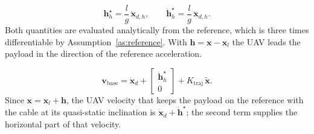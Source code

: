 
\begin{equation}\label{eq:href}
\mathbf{h}_h^\star = \frac{l}{g}\,\ddot{\mathbf{x}}_{d,h},\qquad
\dot{\mathbf{h}}_h^\star = \frac{l}{g}\,\dddot{\mathbf{x}}_{d,h}.
\end{equation}
Both quantities are evaluated analytically from the reference, which is three times
differentiable by Assumption~\ref{as:reference}. With $\mathbf{h}=\mathbf{x}-\mathbf{x}_l$ the
UAV leads the payload in the direction of the reference acceleration.

\begin{equation}\label{eq:base_reference}
\mathbf{v}_{\mathrm{base}} = \dot{\mathbf{x}}_d + \begin{bmatrix}\dot{\mathbf{h}}_h^\star\\ 0\end{bmatrix}
 + K_{\mathrm{traj}}\,\tilde{\mathbf{x}}.
\end{equation}
Since $\mathbf{x}=\mathbf{x}_l+\mathbf{h}$, the UAV velocity that keeps the payload on the reference
with the cable at its quasi-static inclination is $\dot{\mathbf{x}}_d+\dot{\mathbf{h}}^\star$; the
second term supplies the horizontal part of that velocity.

